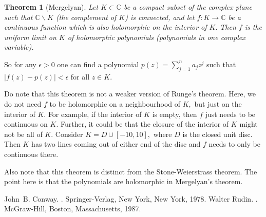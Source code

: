 \documentclass[12pt]{article}
\theoremstyle{theorem}
\newtheorem*{thm}{Theorem}
\theoremstyle{definition}
\begin{document}
\begin{thm}[Mergelyan]
Let $K \subset {\mathbb{C}}$ be a compact subset of the complex plane such that
${\mathbb{C}} \backslash K$ (the complement of $K$) is connected, and let
$f\colon K \to {\mathbb{C}}$ be a continuous function which is also holomorphic
on the interior of $K.$  Then $f$ is the uniform limit on $K$ of holomorphic
polynomials (polynomials in one complex variable).
\end{thm}

So for any $\epsilon > 0$ one can find a polynomial $p(z) = \sum_{j=1}^n a_j z^j$
such that $\lvert f(z) - p(z) \rvert < \epsilon$ for all $z \in K.$

Do note that this theorem is not a weaker version of Runge's theorem.  Here, we do not
need $f$ to be holomorphic on a neighbourhood of $K,$ but just on the interior of $K.$  For example, if the interior of $K$ is empty, then $f$ just needs to be continuous on $K.$  Further, it could be that the closure of the interior of $K$
might not be all of $K.$  Consider $K = D \cup [-10,10],$ where $D$
is the closed unit disc.  Then $K$ has two lines coming out of either end of the disc and $f$ needs to only be continuous there.

Also note that this theorem is distinct from the Stone-Weierstrass theorem.  The point here is that the polynomials are
holomorphic in Mergelyan's theorem.

\begin{thebibliography}{9}
John~B. Conway.
{\em {}}.
Springer-Verlag, New York, New York, 1978.
Walter Rudin.
{\em {}}.
McGraw-Hill, Boston, Massachusetts, 1987.
\end{thebibliography}
\end{document}
